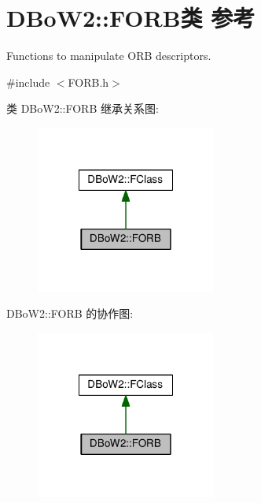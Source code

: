 \hypertarget{classDBoW2_1_1FORB}{\section{D\-Bo\-W2\-:\-:F\-O\-R\-B类 参考}
\label{classDBoW2_1_1FORB}
}


Functions to manipulate O\-R\-B descriptors.  




{\ttfamily \#include $<$F\-O\-R\-B.\-h$>$}



类 D\-Bo\-W2\-:\-:F\-O\-R\-B 继承关系图\-:
\nopagebreak
\begin{figure}[H]
\begin{center}
\leavevmode
\includegraphics[width=168pt]{classDBoW2_1_1FORB__inherit__graph}
\end{center}
\end{figure}


D\-Bo\-W2\-:\-:F\-O\-R\-B 的协作图\-:
\nopagebreak
\begin{figure}[H]
\begin{center}
\leavevmode
\includegraphics[width=168pt]{classDBoW2_1_1FORB__coll__graph}
\end{center}
\end{figure}
